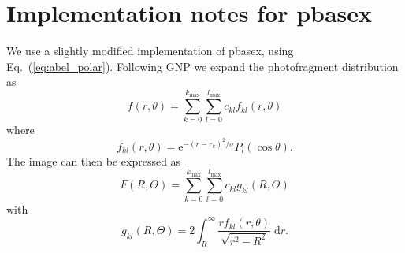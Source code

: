 \documentclass{article}
\renewcommand{\eqref}[1]{Eq.~(\ref{#1})}
\renewcommand{\exp}[1]{\ensuremath{\mathrm{e}^{#1}}}
\begin{document}
\section{Implementation notes for pbasex}
We use a slightly modified implementation of pbasex, using
\eqref{eq:abel_polar}. Following GNP we expand the photofragment distribution
as 
\begin{equation}
  f(r,\theta)=
  \sum_{k=0}^{k_\mathrm{max}}
  \sum_{l=0}^{l_\mathrm{max}}
  c_{kl}f_{kl}(r,\theta)
\end{equation}
where
\begin{equation}
  f_{kl}(r,\theta)=
  \exp{-(r-r_k)^2/\sigma}P_l(\cos\theta).
\end{equation}
The image can then be expressed as
\begin{equation}
  F(R, \Theta)=
  \sum_{k=0}^{k_\mathrm{max}}
  \sum_{l=0}^{l_\mathrm{max}}
  c_{kl}g_{kl}(R,\Theta)
\end{equation}
with
\begin{equation}
  g_{kl}(R,\Theta)=
  2\int_{R}^\infty
  \frac{rf_{kl}(r, \theta)}{\sqrt{r^2-R^2}}\;\mathrm{d}r.
\end{equation}
\end{document}
